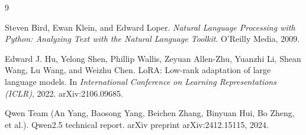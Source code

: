 \begin{thebibliography}{9}

Steven Bird, Ewan Klein, and Edward Loper.
\newblock \emph{Natural Language Processing with Python: Analyzing Text with the Natural Language Toolkit}.
\newblock O'Reilly Media, 2009.

Edward J. Hu, Yelong Shen, Phillip Wallis, Zeyuan Allen-Zhu, Yuanzhi Li, Shean Wang, Lu Wang, and Weizhu Chen.
\newblock LoRA: Low-rank adaptation of large language models.
\newblock In \emph{International Conference on Learning Representations (ICLR)}, 2022. arXiv:2106.09685.

Qwen Team (An Yang, Baosong Yang, Beichen Zhang, Binyuan Hui, Bo Zheng, et al.).
\newblock Qwen2.5 technical report.
\newblock arXiv preprint arXiv:2412.15115, 2024.

\end{thebibliography}
